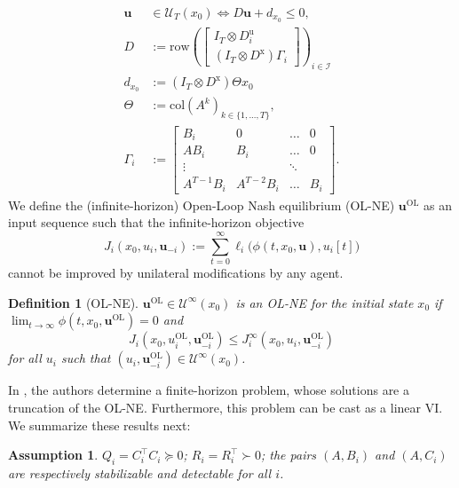 \documentclass[letterpaper, 10 pt, conference]{ieeeconf}  %
\newcommand{\mc}{\mathcal}
\newcommand{\bs}{\boldsymbol}
\newcommand{\col}{\mathrm{col}}
\newcommand{\buol}{\boldsymbol{u}^{\mathrm{OL}}}
\newcommand{\uol}{u^{\mathrm{OL}}}
\newcommand{\bu}{\boldsymbol{u}}
\newcommand{\Dx}{D^{\text{x}}}
\newcommand{\Du}{D^{\text{u}}}
\newcommand{\row}{\mathrm{row}}
\newtheorem{definition}[theorem]{Definition}
\newtheorem{assumption}[theorem]{Assumption}
\begin{document}
\begin{align}
    \bu&\in\mc U_T(x_0) \iff D\bu + d_{x_0} \leq 0, \label{def-constraint1}\\ 
    D &:= 
        \row\left(\begin{bmatrix}
            I_T \otimes \Du_i \\
            (I_T\otimes\Dx)\Gamma_i
        \end{bmatrix}\right)_{i\in\mc I} \label{def-constraint2}\\ 
    d_{x_0} &:= (I_T\otimes \Dx)\Theta x_0 \label{def-constraint3}\\
    \Theta &:= \col(A^k)_{k\in\{1,...,T\}}, \label{def-constraint4}\\
    \Gamma_i &:= \begin{bmatrix}
            B_i & 0 & \dots & 0 \\
            A B_i & B_i & \dots & 0 \\
            \vdots &  & \ddots & \\
            A^{T-1}B_i & A^{T-2}B_i & \dots  &B_i
        \end{bmatrix}. \label{def-constraint5}
\end{align}
We define the (infinite-horizon) Open-Loop Nash equilibrium (OL-NE) $\buol$ as an input sequence such that the infinite-horizon objective
\begin{equation}
    J_i(x_0, u_i, \bs{u}_{-i}):= \sum_{t=0}^{\infty} \ell_i\big(\phi(t,x_0,\bu),u_i[t]\big)
\end{equation}
cannot be improved by unilateral modifications by any agent. 
\begin{definition}[OL-NE] $\buol\in\mc{U}^{\infty}(x_0)$ is an OL-NE for the initial state $x_0$ if $\lim_{t\xrightarrow{}\infty} \phi(t,x_0,\buol)=0$ and
    \begin{equation}
        J_i(x_0, \uol_i, \buol_{-i})\leq J_i^\infty(x_0, u_i, \buol_{-i})
    \end{equation}
    for all $u_i$ such that $(u_i, \buol_{-i})\in\mc{U}^\infty(x_0)$.
\end{definition}
In \cite{benenati2024linear}, the authors determine a finite-horizon problem, whose solutions are a truncation of the OL-NE. Furthermore, this problem can be cast as a linear VI. We summarize these results next:
\begin{assumption} \label{as:objective_system}$Q_i=C_i^{\top}C_i \succeq 0$; $R_i = R_i^{\top}\succ 0$; the pairs $(A,B_i)$ and $(A,C_i)$ are respectively stabilizable and detectable for all $i$.
\end{assumption}
\end{document}
